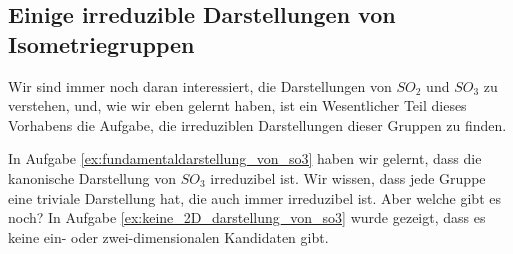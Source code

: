 \subsection{Einige irreduzible Darstellungen von Isometriegruppen}

\begin{remark}
Wir sind immer noch daran interessiert, die Darstellungen von $SO_2$ und $SO_3$ zu verstehen, und, wie wir eben gelernt haben, ist ein Wesentlicher Teil dieses Vorhabens die Aufgabe, die irreduziblen Darstellungen dieser Gruppen zu finden.

In Aufgabe \ref{ex:fundamentaldarstellung_von_so3} haben wir gelernt, dass die kanonische Darstellung von $SO_3$ irreduzibel ist. Wir wissen, dass jede Gruppe eine triviale Darstellung hat, die auch immer irreduzibel ist. Aber welche gibt es noch? In Aufgabe \ref{ex:keine_2D_darstellung_von_so3} wurde gezeigt, dass es keine ein- oder zwei-dimensionalen Kandidaten gibt.
\end{remark}